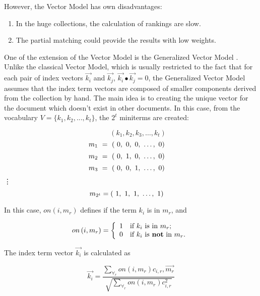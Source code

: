 \documentclass[paper=8.27in:11.69in, 12pt]{scrartcl}
\begin{document}
However, the Vector Model has own disadvantages:

\begin{enumerate}

\item In the huge collections, the calculation of rankings are slow.

\item The partial matching could provide the results with low weights.

\end{enumerate}

One of the extension of the Vector Model is the Generalized Vector Model \cite{wong1985generalized}. Unlike the classical Vector Model, which is usually restricted to the fact that for each pair of index vectors \( \vec{k_{i}} \) and \( \vec{k_{j}} \), \( \vec{k_{i}} \bullet \vec{k_{j}} = 0 \), the Generalized Vector Model assumes that the index term vectors are composed of smaller components derived from the collection by hand. The main idea is to creating the unique vector for the document which doesn't exist in other documents. In this case, from the vocabulary \(V = \{k_{1}, k_{2}, ..., k_{t}\}\), the \(2^{t} \) miniterms are created:


\[\hspace{2em} \left ( k_{1}, k_{2}, k_{3}, \hdots, k_{t} \right )\]
\[\hspace{-1.2em} m_{1} \ = \ \left ( \ 0, \ 0, \ 0, \ \hdots, \ 0 \right )\]
\[\hspace{-1.2em} m_{2} \ = \ \left ( \ 0, \ 1, \ 0, \ \hdots, \ 0 \right )\]
\[\hspace{-1.2em} m_{3} \ = \ \left ( \ 0, \ 0, \ 1, \ \hdots, \ 0 \right )\]
\centering\vdots
\[\hspace{-1.2em} m_{2^{t}} = \left ( \ 1, \ 1, \ 1, \ \hdots, \ 1 \right )\]

\raggedright
In this case, \(on \left ( i, m_{r} \right ) \) defines if the term \(k_{i}\) is in \(m_{r}\), and 

\[ on \left ( i, m_{r} \right ) = \left\{ \begin{array}{ll}
1 & \mbox{if $k_{i} \ \text{is in} \ m_{r}$};\\
$0$ & \mbox{if $k_{i} \ \text{is \textbf{not} in} \ m_{r}$}.\end{array} \right. \]

The index term vector \( \vec{k_{i}} \) is calculated as

\[ \vec{k_{i}} = \frac{\sum_{\forall_{r}} on \left ( i, m_{r} \right ) c_{i, r}, \vec{m_{r}} }{\sqrt{\sum_{\forall_{r}} on \left ( i, m_{r} \right ) c^{2}_{i, r}}} \]
\end{document}
